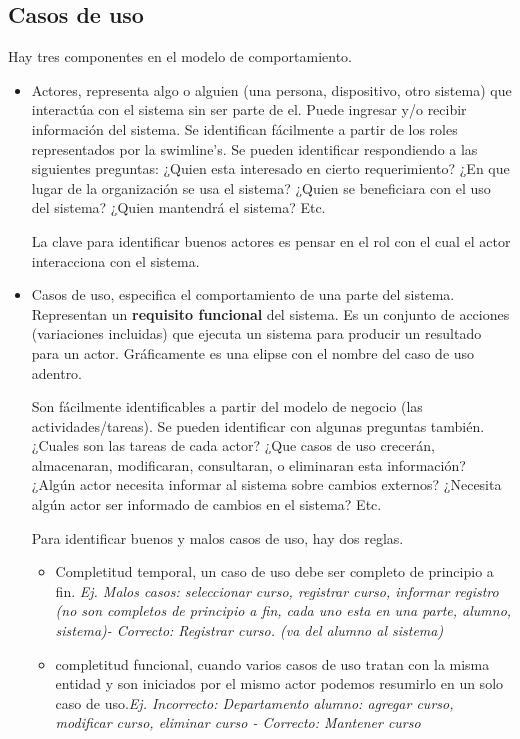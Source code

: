 \documentclass[titlepage,a4paper]{article}
\begin{document}
\subsection{Casos de uso}
Hay tres componentes en el modelo de comportamiento.
\begin{itemize}
    \item Actores, representa algo o alguien (una persona, dispositivo, otro sistema) que interactúa con el sistema sin ser parte de el. Puede ingresar y/o recibir información del sistema. Se identifican fácilmente a partir de los roles representados por la swimline's. Se pueden identificar respondiendo a las siguientes preguntas: ¿Quien esta interesado en cierto requerimiento? ¿En que lugar de la organización se usa el sistema? ¿Quien se beneficiara con el uso del sistema? ¿Quien mantendrá el sistema? Etc.
    
    La clave para identificar buenos actores es pensar en el rol con el cual el actor interacciona con el sistema.

    \item Casos de uso, especifica el comportamiento de una parte del sistema. Representan un \textbf{requisito funcional} del sistema. Es un conjunto de acciones (variaciones incluidas) que ejecuta un sistema para producir un resultado para un actor. Gráficamente es una elipse con el nombre del caso de uso adentro.
    
    Son fácilmente identificables a partir del modelo de negocio (las actividades/tareas). Se pueden identificar con algunas preguntas también. ¿Cuales son las tareas de cada actor? ¿Que casos de uso crecerán, almacenaran, modificaran, consultaran, o eliminaran esta información? ¿Algún actor necesita informar al sistema sobre cambios externos? ¿Necesita algún actor ser informado de cambios en el sistema? Etc.
    
    Para identificar buenos y malos casos de uso, hay dos reglas.
    \begin{itemize}
        \item Completitud temporal, un caso de uso debe ser completo de principio a fin. \textit{Ej. Malos casos: seleccionar curso, registrar curso, informar registro (no son completos de principio a fin, cada uno esta en una parte, alumno, sistema)- Correcto: Registrar curso. (va del alumno al sistema)}
        \item completitud funcional, cuando varios casos de uso tratan con la misma entidad y son iniciados por el mismo actor podemos resumirlo en un solo caso de uso.\textit{Ej. Incorrecto: Departamento alumno: agregar curso, modificar curso, eliminar curso - Correcto: Mantener curso}
    \end{itemize}
    

\end{itemize}
\end{document}
